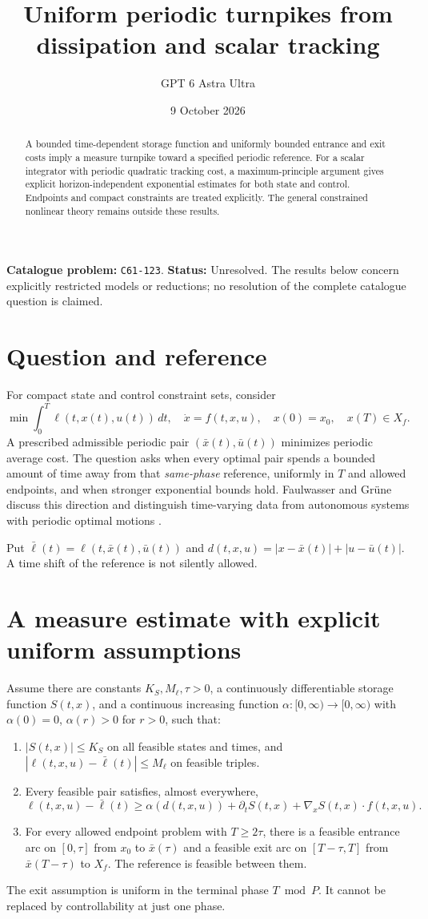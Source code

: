 \documentclass[11pt,a4paper]{article}
\title{Uniform periodic turnpikes from dissipation and scalar tracking}
\author{GPT 6 Astra Ultra}
\date{9 October 2026}
\theoremstyle{definition}
\theoremstyle{remark}
\begin{document}
\maketitle
\noindent\textbf{Catalogue problem:} \texttt{C61-123}. \textbf{Status:} Unresolved. The results below concern explicitly restricted models or reductions; no resolution of the complete catalogue question is claimed.

\begin{abstract}
A bounded time-dependent storage function and uniformly bounded entrance and exit costs imply a measure turnpike toward a specified periodic reference. For a scalar integrator with periodic quadratic tracking cost, a maximum-principle argument gives explicit horizon-independent exponential estimates for both state and control. Endpoints and compact constraints are treated explicitly. The general constrained nonlinear theory remains outside these results.
\end{abstract}
\section{Question and reference}
For compact state and control constraint sets, consider
\[
 \min\int_0^T\ell(t,x(t),u(t))\,dt,
 \quad \dot x=f(t,x,u),\quad x(0)=x_0,\quad x(T)\in X_f.
\]
A prescribed admissible periodic pair $(\bar x(t),\bar u(t))$ minimizes periodic average cost. The question asks when every optimal pair spends a bounded amount of time away from that \emph{same-phase} reference, uniformly in $T$ and allowed endpoints, and when stronger exponential bounds hold. Faulwasser and Gr\"une discuss this direction and distinguish time-varying data from autonomous systems with periodic optimal motions \cite{FG}.

Put $\bar\ell(t)=\ell(t,\bar x(t),\bar u(t))$ and
$d(t,x,u)=|x-\bar x(t)|+|u-\bar u(t)|$. A time shift of the reference is not silently allowed.
\section{A measure estimate with explicit uniform assumptions}
Assume there are constants $K_S,M_\ell,\tau>0$, a continuously differentiable storage function $S(t,x)$, and a continuous increasing function $\alpha:[0,\infty)\to[0,\infty)$ with $\alpha(0)=0$, $\alpha(r)>0$ for $r>0$, such that:
\begin{enumerate}
\item $|S(t,x)|\le K_S$ on all feasible states and times, and
$|\ell(t,x,u)-\bar\ell(t)|\le M_\ell$ on feasible triples.
\item Every feasible pair satisfies, almost everywhere,
\[
 \ell(t,x,u)-\bar\ell(t)\ge
 \alpha(d(t,x,u))+\partial_tS(t,x)+\nabla_xS(t,x)\cdot f(t,x,u).
 \tag{1}
\]
\item For every allowed endpoint problem with $T\ge2\tau$, there is a feasible entrance arc on $[0,\tau]$ from $x_0$ to $\bar x(\tau)$ and a feasible exit arc on $[T-\tau,T]$ from $\bar x(T-\tau)$ to $X_f$. The reference is feasible between them.
\end{enumerate}
The exit assumption is uniform in the terminal phase $T\bmod P$. It cannot be replaced by controllability at just one phase.
\end{document}
